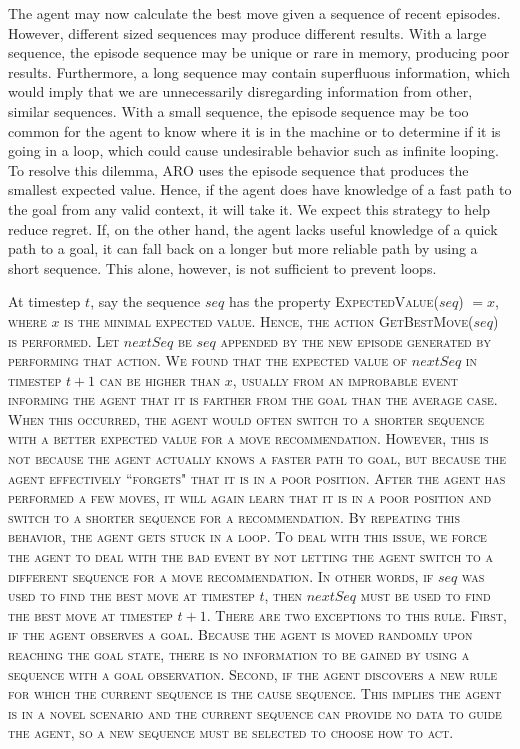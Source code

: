 \documentclass[letterpaper]{article} %
\begin{document}
The agent may now calculate the best move given a sequence of recent episodes. However, different sized sequences may produce different results. With a large sequence, the episode sequence may be unique or rare in memory, producing poor results. Furthermore, a long sequence may contain superfluous information, which would imply that we are unnecessarily disregarding information from other, similar sequences. With a small sequence, the episode sequence may be too common for the agent to know where it is in the machine or to determine if it is going in a loop, which could cause undesirable behavior such as infinite looping. To resolve this dilemma, ARO uses the episode sequence that produces the smallest expected value. Hence, if the agent does have knowledge of a fast path to the goal from any valid context, it will take it. We expect this strategy to help reduce regret. If, on the other hand, the agent lacks useful knowledge of a quick path to a goal, it can fall back on a longer but more reliable path by using a short sequence. This alone, however, is not sufficient to prevent loops.

At timestep $t$, say the sequence $seq$ has the property \scshape ExpectedValue\normalfont($seq$) $ = x$, where $x$ is the minimal expected value. Hence, the action \scshape GetBestMove\normalfont($seq$) is performed. Let $nextSeq$ be $seq$ appended by the new episode generated by performing that action. We found that the expected value of $nextSeq$ in timestep $t+ 1$ can be higher than $x$, usually from an improbable event informing the agent that it is farther from the goal than the average case. When this occurred, the agent would often switch to a shorter sequence with a better expected value for a move recommendation. However, this is not because the agent actually knows a faster path to goal, but because the agent effectively ``forgets" that it is in a poor position. After the agent has performed a few moves, it will again learn that it is in a poor position and switch to a shorter sequence for a recommendation. By repeating this behavior, the agent gets stuck in a loop. To deal with this issue, we force the agent to deal with the bad event by not letting the agent switch to a different sequence for a move recommendation. In other words, if $seq$ was used to find  the best move at timestep $t$, then $nextSeq$ must be used to find the best move at timestep $t+1$. There are two exceptions to this rule. First, if the agent observes a goal. Because the agent is moved randomly upon reaching the goal state, there is no information to be gained by using a sequence with a goal observation. Second, if the agent discovers a new rule for which the current sequence is the cause sequence. This implies the agent is in a novel scenario and the current sequence can provide no data to guide the agent, so a new sequence must be selected to choose how to act.
\end{document}
